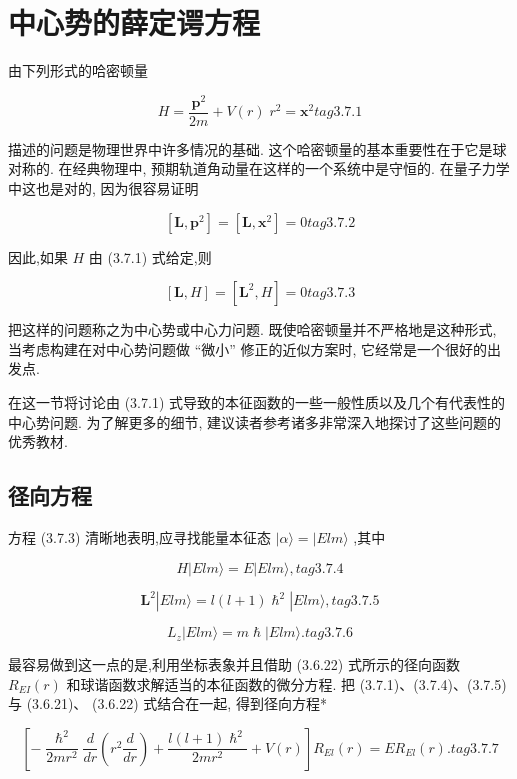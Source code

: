 \section{中心势的薛定谔方程}
由下列形式的哈密顿量

$$
H = \frac{{\mathbf{p}}^{2}}{2m} + V\left( r\right) \;{r}^{2} = {\mathbf{x}}^{2} tag{3.7.1}
$$

描述的问题是物理世界中许多情况的基础. 这个哈密顿量的基本重要性在于它是球对称的. 在经典物理中, 预期轨道角动量在这样的一个系统中是守恒的. 在量子力学中这也是对的, 因为很容易证明

$$
\left\lbrack {\mathbf{L},{\mathbf{p}}^{2}}\right\rbrack = \left\lbrack {\mathbf{L},{\mathbf{x}}^{2}}\right\rbrack = 0 tag{3.7.2}
$$

因此,如果 $H$ 由 (3.7.1) 式给定,则

$$
\left\lbrack {\mathbf{L}, H}\right\rbrack = \left\lbrack {{\mathbf{L}}^{2}, H}\right\rbrack = 0 tag{3. 7.3}
$$

把这样的问题称之为中心势或中心力问题. 既使哈密顿量并不严格地是这种形式, 当考虑构建在对中心势问题做 “微小” 修正的近似方案时, 它经常是一个很好的出发点.

在这一节将讨论由 (3.7.1) 式导致的本征函数的一些一般性质以及几个有代表性的中心势问题. 为了解更多的细节, 建议读者参考诸多非常深入地探讨了这些问题的优秀教材.

\subsection{径向方程}

方程 (3.7.3) 清晰地表明,应寻找能量本征态 $\left| {\alpha \rangle = }\right| {Elm}\rangle$ ,其中

$$
H\left| {{Elm}\rangle = E}\right| {Elm}\rangle , tag{3. 7.4}
$$

$$
{\mathbf{L}}^{2}\left| {{Elm}\rangle = l\left( {l + 1}\right) {\hslash }^{2}}\right| {Elm}\rangle , tag{3. 7.5}
$$

$$
{L}_{z}\left| {{Elm}\rangle = m\hslash }\right| {Elm}\rangle . tag{3.7.6}
$$

最容易做到这一点的是,利用坐标表象并且借助 (3.6.22) 式所示的径向函数 ${R}_{EI}\left( r\right)$ 和球谐函数求解适当的本征函数的微分方程. 把 (3.7.1)、(3.7.4)、(3.7.5) 与 (3.6.21)、 (3.6.22) 式结合在一起, 得到径向方程*

$$
\left\lbrack {-\frac{{\hslash }^{2}}{{2m}{r}^{2}}\frac{d}{dr}\left( {{r}^{2}\frac{d}{dr}}\right) + \frac{l\left( {l + 1}\right) {\hslash }^{2}}{{2m}{r}^{2}} + V\left( r\right) }\right\rbrack {R}_{El}\left( r\right) = E{R}_{El}\left( r\right) . tag{3.7.7}
$$

